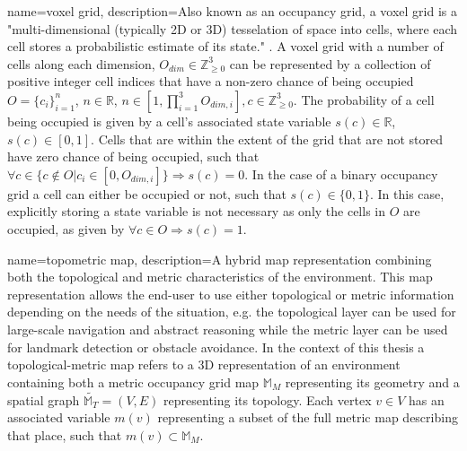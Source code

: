{
    name=voxel grid,
    description={Also known as an occupancy grid, a voxel grid is a "multi-dimensional (typically 2D or 3D) tesselation of space into cells, where each cell stores a probabilistic estimate of its state." \citep{elfes_occupancy_1990}. A voxel grid with a number of cells along each dimension, \(O_{dim} \in \mathbb{Z}^3_{\geq0}\) can be represented by a collection of positive integer cell indices that have a non-zero chance of being occupied \(O=\{c_i\}_{i=1}^{n}\), \(n \in \mathbb{R}\), \(n \in [1, \prod_{i=1}^{3}O_{dim,i}], c \in \mathbb{Z}^3_{\geq 0} \). The probability of a cell being occupied is given by a cell's associated state variable \(s(c) \in \mathbb{R}\), \(s(c) \in [0,1]\). Cells that are within the extent of the grid that are not stored have zero chance of being occupied, such that \(\forall c \in \{c \notin O | c_i \in [0, O_{dim,i}]\} \Rightarrow s(c)=0\). In the case of a binary occupancy grid a cell can either be occupied or not, such that \(s(c) \in \{0,1\}\). In this case, explicitly storing a state variable is not necessary as only the cells in \(O\) are occupied, as given by \(\forall c \in O \Rightarrow s(c)=1\). }
}

{
    name=topometric map,
    description={A hybrid map representation combining both the topological and metric characteristics of the environment. This map representation allows the end-user to use either topological or metric information depending on the needs of the situation, e.g. the topological layer can be used for large-scale navigation and abstract reasoning while the metric layer can be used for landmark detection or obstacle avoidance. In the context of this thesis a topological-metric map refers to a 3D representation of an environment containing both a metric occupancy grid map \(\mathbb{M}_M\) representing its geometry and a spatial graph \(\widetilde{\mathbb{M}_T}=(V, E)\) representing its topology. Each vertex \(v \in V\) has an associated variable \(m(v)\) representing a subset of the full metric map describing that place, such that \(m(v) \subset \mathbb{M}_M\). }
}